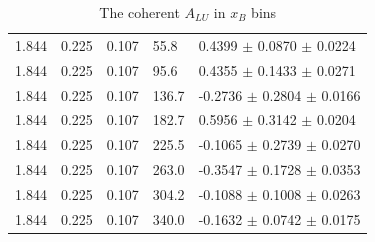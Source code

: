 \begin{table}[!h]
\begin{center}
\begin{tabular}{||l|l|l|l|l||}
  1.844 & 0.225 & 0.107 & 55.8  &  0.4399 $\pm$ 0.0870 $\pm$ 0.0224 \\
  1.844 & 0.225 & 0.107 & 95.6  &  0.4355 $\pm$ 0.1433 $\pm$ 0.0271 \\
  1.844 & 0.225 & 0.107 & 136.7 & -0.2736 $\pm$ 0.2804 $\pm$ 0.0166 \\
  1.844 & 0.225 & 0.107 & 182.7 &  0.5956 $\pm$ 0.3142 $\pm$ 0.0204 \\
  1.844 & 0.225 & 0.107 & 225.5 & -0.1065 $\pm$ 0.2739 $\pm$ 0.0270 \\
  1.844 & 0.225 & 0.107 & 263.0 & -0.3547 $\pm$ 0.1728 $\pm$ 0.0353 \\
  1.844 & 0.225 & 0.107 & 304.2 & -0.1088 $\pm$ 0.1008 $\pm$ 0.0263 \\
  1.844 & 0.225 & 0.107 & 340.0 & -0.1632 $\pm$ 0.0742 $\pm$ 0.0175 \\
         
         \hline 
         \hline
      \end{tabular}
      \caption{The coherent $A_{LU}$ in $x_B$ bins}
      \label{table:Coh_xB_BSA}
   \end{center}
\end{table}                        

